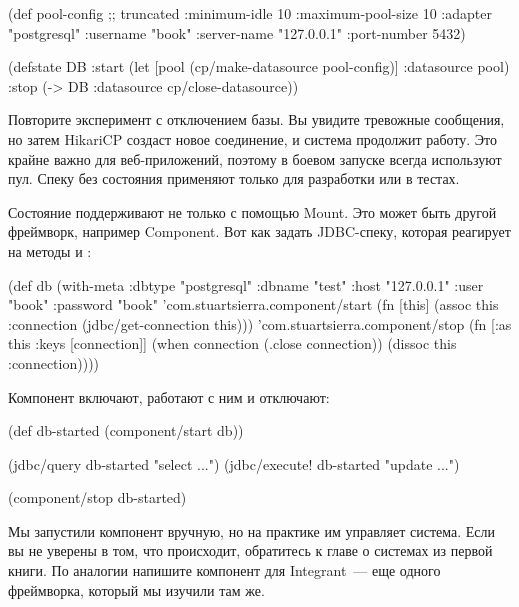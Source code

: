 \begin{english}
  \begin{clojure}
(def pool-config ;; truncated
  {:minimum-idle       10
   :maximum-pool-size  10
   :adapter            "postgresql"
   :username           "book"
   :server-name        "127.0.0.1"
   :port-number        5432})

(defstate DB
  :start
  (let [pool (cp/make-datasource pool-config)]
    {:datasource pool})
  :stop
  (-> DB :datasource cp/close-datasource))
  \end{clojure}
\end{english}

Повторите эксперимент с отключением базы. Вы увидите тревожные сообщения, но затем HikariCP создаст новое соединение, и система продолжит работу. Это крайне важно для веб-приложений, поэтому в боевом запуске всегда используют пул. Спеку без состояния применяют только для разработки или в тестах.

Состояние поддерживают не только с помощью Mount. Это может быть другой фреймворк, например Component. Вот как задать JDBC-спеку, которая реагирует на методы  и :

\begin{english}
  \begin{clojure}
(def db
  (with-meta
    {:dbtype "postgresql"
     :dbname "test"
     :host "127.0.0.1"
     :user "book"
     :password "book"}
    {'com.stuartsierra.component/start
     (fn [this]
       (assoc this :connection
              (jdbc/get-connection this)))
     'com.stuartsierra.component/stop
     (fn [{:as this :keys [connection]}]
       (when connection
         (.close connection))
       (dissoc this :connection))}))
  \end{clojure}
\end{english}

Компонент включают, работают с ним и отключают:

\begin{english}
  \begin{clojure}
(def db-started (component/start db))

(jdbc/query db-started "select ...")
(jdbc/execute! db-started "update ...")

(component/stop db-started)
  \end{clojure}
\end{english}

Мы запустили компонент вручную, но на практике им управляет система. Если вы не уверены в том, что происходит, обратитесь к главе о системах из первой книги. По аналогии напишите компонент для Integrant~--- еще одного фреймворка, который мы изучили там же.

